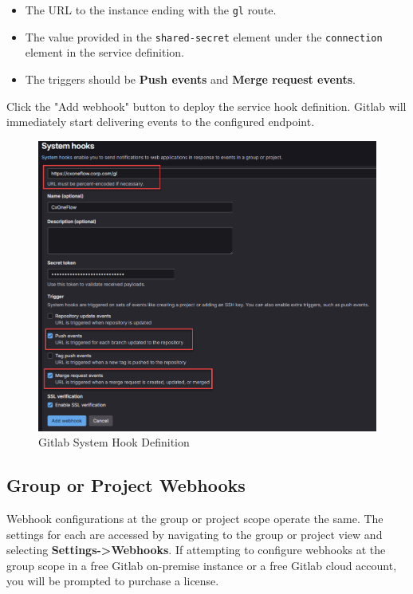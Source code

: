 \begin{itemize}
  \item The URL to the \cxoneflow instance ending with the \texttt{gl} route.
  \item The value provided in the \texttt{shared-secret} element under the \texttt{connection} element in the service definition.
  \item The triggers should be \textbf{Push events} and \textbf{Merge request events}.
\end{itemize}

Click the "Add webhook" button to deploy the service hook definition.  Gitlab will immediately start delivering
events to the configured \cxoneflow endpoint.

\begin{figure}[ht]
  \centering
  \includegraphics[width=\textwidth]{graphics/gl-service-hooks.png}
  \caption{Gitlab System Hook Definition}
  \label{fig:gl-service-hook-def}
\end{figure}

\subsection{Group or Project Webhooks}

Webhook configurations at the group or project scope operate the same.  The settings for each
are accessed by navigating to the group or project view and selecting \textbf{Settings->Webhooks}.
If attempting to configure webhooks at the group scope in a free Gitlab on-premise instance or
a free Gitlab cloud account, you will be prompted to purchase a license.

